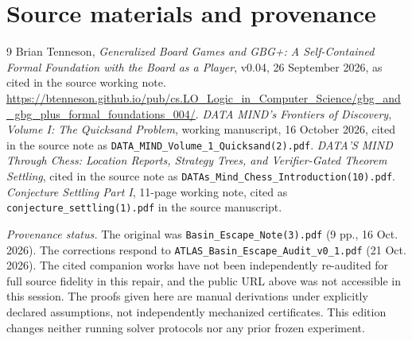 \documentclass[11pt,letterpaper]{article}
\theoremstyle{remark}
\begin{document}
\section*{Source materials and provenance}
\begin{thebibliography}{9}\small
{} Brian Tenneson, \emph{Generalized Board Games and GBG+: A Self-Contained Formal Foundation with the Board as a Player}, v0.04, 26 September 2026, as cited in the source working note. \url{https://btenneson.github.io/pub/cs.LO_Logic_in_Computer_Science/gbg_and_gbg_plus_formal_foundations_004/}.
 \emph{DATA MIND's Frontiers of Discovery, Volume I: The Quicksand Problem}, working manuscript, 16 October 2026, cited in the source note as \texttt{DATA\_MIND\_Volume\_1\_Quicksand(2).pdf}.
 \emph{DATA'S MIND Through Chess: Location Reports, Strategy Trees, and Verifier-Gated Theorem Settling}, cited in the source note as \texttt{DATAs\_Mind\_Chess\_Introduction(10).pdf}.
 \emph{Conjecture Settling Part I}, 11-page working note, cited as \texttt{conjecture\_settling(1).pdf} in the source manuscript.
\end{thebibliography}
\textit{Provenance status.} The original was \texttt{Basin\_Escape\_Note(3).pdf} (9 pp., 16 Oct. 2026). The corrections respond to \texttt{ATLAS\_Basin\_Escape\_Audit\_v0\_1.pdf} (21 Oct. 2026). The cited companion works have not been independently re-audited for full source fidelity in this repair, and the public URL above was not accessible in this session. The proofs given here are manual derivations under explicitly declared assumptions, not independently mechanized certificates. This edition changes neither running solver protocols nor any prior frozen experiment.
\end{document}
